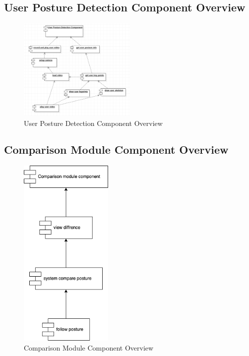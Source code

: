 \documentclass[16pt]{scrreprt}
\begin{document}
\subsection{User Posture Detection Component Overview}
\begin{figure}[H]
  \centering
  \includegraphics[width=0.505\textwidth]{diagrams/detection-com.png}
  \caption{User Posture Detection Component Overview}
\end{figure}

\subsection{Comparison Module Component Overview}
\begin{figure}[H]
    \centering
    \includegraphics[width=0.4\textwidth]{diagrams/comparison.png}
    \caption{Comparison Module Component Overview}
\end{figure}
\end{document}
